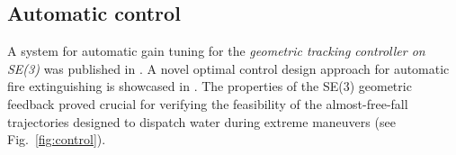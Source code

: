 \documentclass[a4paper,11pt,titlepage,twoside]{book}
\newcommand{\reffig}[1]{Fig.~\ref{#1}}
\begin{document}
  \subsection{Automatic control}

  A system for automatic gain tuning for the \emph{geometric tracking controller on SE(3)} was published in \cite{giernacki2019realtime}.
  A novel optimal control design approach for automatic fire extinguishing is showcased in \cite{saikin2020wildfire}.
  The properties of the SE(3) geometric feedback proved crucial for verifying the feasibility of the almost-free-fall trajectories designed to dispatch water during extreme maneuvers (see \reffig{fig:control}).

  \begin{figure}
    \centering
    \hfill%
\end{figure}
\end{document}
